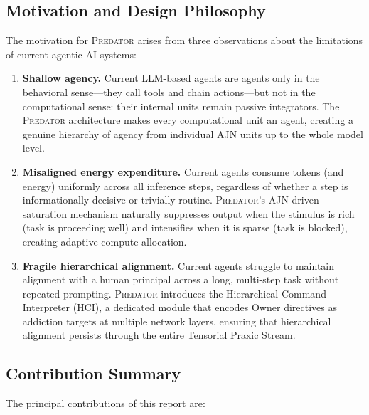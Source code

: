 \documentclass[12pt,a4paper]{article}
\newcommand{\PREDATOR}{\textsc{Predator}}
\begin{document}
\subsection{Motivation and Design Philosophy}

The motivation for \PREDATOR{} arises from three observations about the
limitations of current agentic AI systems:

\begin{enumerate}
  \item \textbf{Shallow agency.} Current LLM-based agents are agents only in
    the behavioral sense---they call tools and chain actions---but not in the
    computational sense: their internal units remain passive integrators. The
    \PREDATOR{} architecture makes every computational unit an agent, creating
    a genuine hierarchy of agency from individual AJN units up to the whole
    model level.

  \item \textbf{Misaligned energy expenditure.} Current agents consume tokens
    (and energy) uniformly across all inference steps, regardless of whether
    a step is informationally decisive or trivially routine. \PREDATOR's
    AJN-driven saturation mechanism naturally suppresses output when the
    stimulus is rich (task is proceeding well) and intensifies when it is
    sparse (task is blocked), creating adaptive compute allocation.

  \item \textbf{Fragile hierarchical alignment.} Current agents struggle to
    maintain alignment with a human principal across a long, multi-step task
    without repeated prompting. \PREDATOR{} introduces the Hierarchical
    Command Interpreter (HCI), a dedicated module that encodes Owner
    directives as addiction targets at multiple network layers, ensuring that
    hierarchical alignment persists through the entire Tensorial Praxic
    Stream.
\end{enumerate}

\subsection{Contribution Summary}

The principal contributions of this report are:
\end{document}
